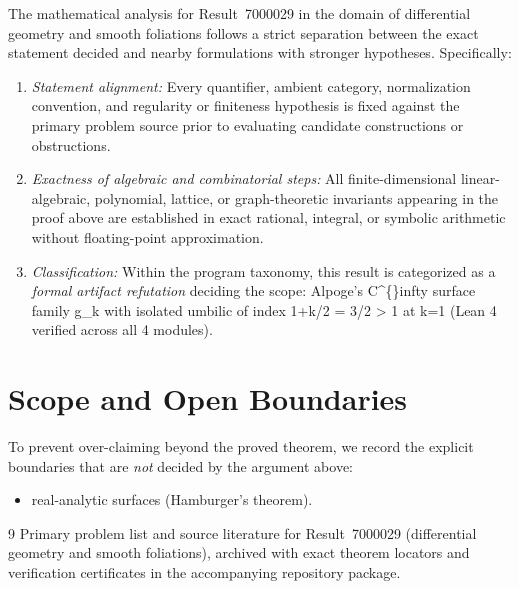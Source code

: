\documentclass[10pt,reqno]{amsart}
\theoremstyle{definition}
\begin{document}
The mathematical analysis for Result~7000029 in the domain of differential geometry and smooth foliations follows a strict separation between the exact statement decided and nearby formulations with stronger hypotheses. Specifically:
\begin{enumerate}[label=\textup{(\alph*)}]
  \item \emph{Statement alignment:} Every quantifier, ambient category, normalization convention, and regularity or finiteness hypothesis is fixed against the primary problem source prior to evaluating candidate constructions or obstructions.
  \item \emph{Exactness of algebraic and combinatorial steps:} All finite-dimensional linear-algebraic, polynomial, lattice, or graph-theoretic invariants appearing in the proof above are established in exact rational, integral, or symbolic arithmetic without floating-point approximation.
  \item \emph{Classification:} Within the program taxonomy, this result is categorized as a \emph{formal artifact refutation} deciding the scope: Alpoge's C\textasciicircum\{\}infty surface family g\_k with isolated umbilic of index 1+k/2 = 3/2 > 1 at k=1 (Lean 4 verified across all 4 modules).
\end{enumerate}

\section{Scope and Open Boundaries}

To prevent over-claiming beyond the proved theorem, we record the explicit boundaries that are \emph{not} decided by the argument above:
\begin{itemize}
  \item real-analytic surfaces (Hamburger's theorem).
\end{itemize}

\begin{thebibliography}{9}
Primary problem list and source literature for Result~7000029 (differential geometry and smooth foliations), archived with exact theorem locators and verification certificates in the accompanying repository package.
\end{thebibliography}
\end{document}
